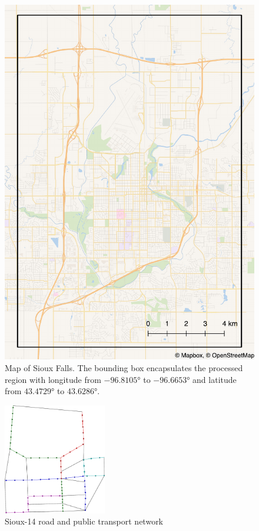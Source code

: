 \begin{figure}
    \centering
    \includegraphics[width=1.0\textwidth]{figures/sioux_falls.pdf}
    \caption{Map of Sioux Falls. The bounding box encapsulates the
    processed region with longitude from $-96.8105°$ to $-96.6653°$ and latitude from $43.4729°$ to $43.6286°$.}
    \label{fig:original_map}
\end{figure}

\begin{figure}
    \centering
    \includegraphics[width=0.4\textwidth]{figures/sioux14_pt_cropped.pdf}
    \caption{Sioux-14 road and public transport network}
    \label{fig:sioux14}
\end{figure}

